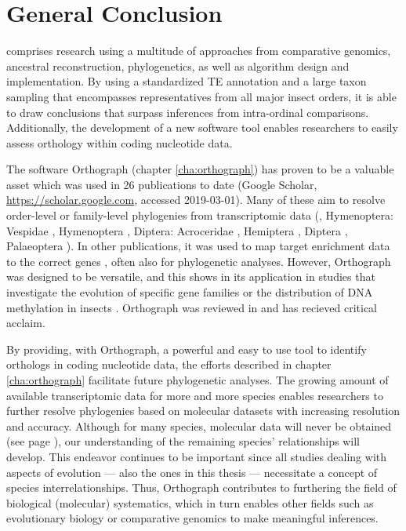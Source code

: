 \chapter{General Conclusion}
\label{cha:general-conclusion}

 comprises research using a multitude of
approaches from comparative genomics, ancestral reconstruction,
phylogenetics, as well as algorithm design and implementation. By using
a standardized TE annotation and a large taxon sampling that encompasses
representatives from all major insect orders, it is able to draw
conclusions that surpass inferences from intra-ordinal comparisons.
Additionally, the development of a new software tool enables researchers
to easily assess orthology within coding nucleotide data.

The software Orthograph (chapter \ref{cha:orthograph}) has proven to be
a valuable asset which was used in 26 publications to date (Google Scholar,
\url{https://scholar.google.com}, accessed 2019-03-01). Many of these aim to
resolve order-level or family-level phylogenies from transcriptomic data (\eg,
Hymenoptera: Vespidae \citep{Bank2017}, Hymenoptera \citep{Peters2017},
Diptera: Acroceridae \citep{Gillung2018}, Hemiptera \citep{Johnson2018},
Diptera \citep{Kutty2018}, Palaeoptera \citep{Simon2018}). In other
publications, it was used to map target enrichment data to the correct genes
\citep{Mayer2016, Sann2018, Shin2018}, often also for phylogenetic analyses.
However, Orthograph was designed to be versatile, and this shows in its
application in studies that investigate the evolution of specific gene families
\citep{Pauli2016, Dowling2017} or the distribution of DNA methylation in
insects \citet{Provataris2018}.  Orthograph was reviewed in \citet{Nichio2017}
and has recieved critical acclaim.

By providing, with Orthograph, a powerful and easy to use tool to
identify orthologs in coding nucleotide data, the efforts described in
chapter \ref{cha:orthograph} facilitate future phylogenetic analyses.
The growing amount of available transcriptomic data for more and more
species enables researchers to further resolve phylogenies based on
molecular datasets with increasing resolution and accuracy. Although for
many species, molecular data will never be obtained (see page
\pageref{mass-extinction}), our understanding of the remaining species'
relationships will develop. This endeavor continues to be important
since all studies dealing with aspects of evolution --- also the ones in
this thesis --- necessitate a concept of species interrelationships.
Thus, Orthograph contributes to furthering the field of biological
(molecular) systematics, which in turn enables other fields such as
evolutionary biology or comparative genomics to make meaningful
inferences.

